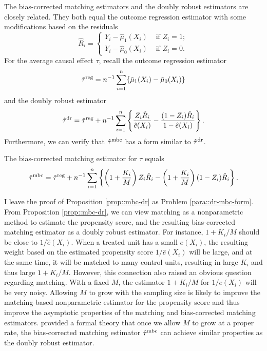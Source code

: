 The bias-corrected matching estimators and the doubly robust estimators are closely related. They both equal the outcome regression estimator
with some modifications based on the residuals 
$$ 
 \hat{R}_i = 
 \begin{cases}
 Y_i - \hat{\mu}_1(X_i)  & \text{ if } Z_i=1;\\
 Y_i - \hat{\mu}_0(X_i)    & \text{ if } Z_i=0.
\end{cases} 
 $$
  For the average causal effect $\tau$, recall the outcome regression estimator  
$$
\hat{\tau}^{\textup{reg}} =  n^{-1} \sum_{i=1}^n \{ \hat{\mu}_1(X_i) -  \hat{\mu}_0(X_i)\} 
$$
and the doubly robust estimator 
$$
\hat{\tau}^\textup{dr}  =  \hat{\tau}^{\textup{reg}} 
+ n^{-1} \sum_{i=1}^n \left\{  \frac{Z_i \hat{R}_i }{ \hat{e}(X_i)} -  \frac{ (1-Z_i) \hat{R}_i}{ 1-  \hat{e}(X_i) } \right\} .
$$
Furthermore, we can verify that $\hat{\tau}^\textup{mbc} $ has a form similar to $\hat{\tau}^\textup{dr}  $.
\begin{proposition}
\label{prop::mbc-dr}
The bias-corrected matching estimator for $\tau$ equals 
$$
\hat{\tau}^\textup{mbc}   =\hat{\tau}^{\textup{reg}} 
+ n^{-1} \sum_{i=1}^n \left\{ \left(1+{ K_i\over M} \right)  Z_i \hat{R}_i  - \left( 1+{ K_i\over M} \right) (1-Z_i)  \hat{R}_i \right\} .
$$
\end{proposition}

I leave the proof of Proposition \ref{prop::mbc-dr}  as Problem \ref{para::dr-mbc-form}.  From Proposition \ref{prop::mbc-dr}, we can view matching as a nonparametric method to estimate the propensity score, and the resulting bias-corrected matching estimator as a doubly robust estimator. For instance, $1+K_i /  M$ should be close to $1/\hat{e}(X_i)$. When a treated unit has a small $e(X_i)$, the resulting weight based on the estimated propensity score $1/\hat{e}(X_i)$ will be large, and at the same time, it will be matched to many control units, resulting in large $K_i$ and thus large $1+K_i /  M$. However, this connection also raised an obvious question regarding matching. With a fixed $M$, the estimator $1+K_i /  M$ for $1/e(X_i)$ will be very noisy. Allowing $M$ to grow with the sampling size is likely to improve the matching-based nonparametric estimator for the propensity score and thus improve the asymptotic properties of the matching and bias-corrected matching estimators. \citet{lin2023estimation} provided a formal theory that once we allow $M$ to grow at a proper rate, the bias-corrected matching estimator $\hat{\tau}^\textup{mbc}   $ can achieve similar properties as the doubly robust estimator.  


